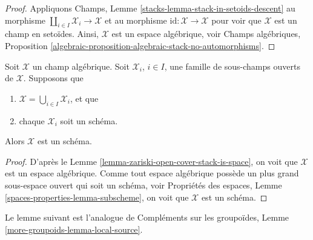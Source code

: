 \begin{proof}
Appliquons
Champs, Lemme \ref{stacks-lemma-stack-in-setoids-descent}
au morphisme $\coprod_{i \in I} \mathcal{X}_i \to \mathcal{X}$
et au morphisme $\text{id} : \mathcal{X} \to \mathcal{X}$ pour
voir que $\mathcal{X}$ est un champ en setoïdes.
Ainsi, $\mathcal{X}$ est un espace algébrique, voir
Champs algébriques,
Proposition \ref{algebraic-proposition-algebraic-stack-no-automorphisms}.
\end{proof}

\begin{lemma}
\label{lemma-zariski-open-cover-stack-is-scheme}
Soit $\mathcal X$ un champ algébrique.
Soit $\mathcal{X}_i$, $i \in I$, une famille de sous-champs ouverts de $\mathcal{X}$.
Supposons que
\begin{enumerate}
\item $\mathcal{X} = \bigcup_{i \in I} \mathcal{X}_i$, et que
\item chaque $\mathcal{X}_i$ soit un schéma.
\end{enumerate}
Alors $\mathcal{X}$ est un schéma.
\end{lemma}

\begin{proof}
D'après le
Lemme \ref{lemma-zariski-open-cover-stack-is-space},
on voit que $\mathcal{X}$ est un espace algébrique. Comme tout espace
algébrique possède un plus grand sous-espace ouvert qui soit un schéma, voir
Propriétés des espaces, Lemme \ref{spaces-properties-lemma-subscheme},
on voit que $\mathcal{X}$ est un schéma.
\end{proof}


\noindent
Le lemme suivant est l'analogue de
Compléments sur les groupoïdes, Lemme \ref{more-groupoids-lemma-local-source}.

